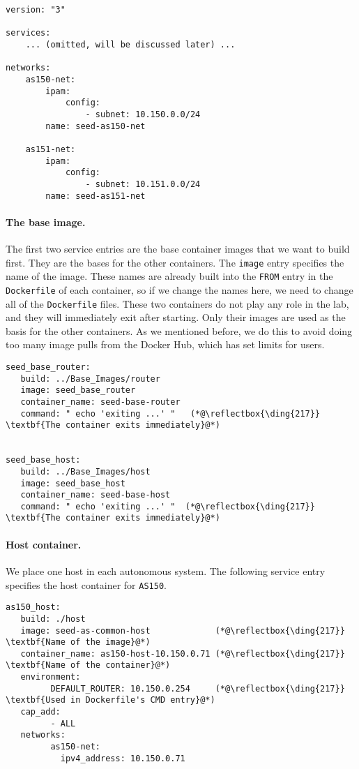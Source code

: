 \begin{lstlisting}
version: "3"

services:
    ... (omitted, will be discussed later) ...

networks:
    as150-net:
        ipam:
            config:
                - subnet: 10.150.0.0/24
        name: seed-as150-net

    as151-net:
        ipam:
            config:
                - subnet: 10.151.0.0/24
        name: seed-as151-net
\end{lstlisting}
 


\paragraph{The base image.} 
The first two service entries are the base container images  
that we want to build first. They are the bases for the other containers. 
The \texttt{image} entry specifies the name of the image.
These names are already built into the 
\texttt{FROM} entry in the \texttt{Dockerfile} 
of each container, so if we change the names here,
we need to change all of the \texttt{Dockerfile} files. These 
two containers do not play any role in the lab, and they will
immediately exit after starting. Only their images 
are used as the basis for the other containers. As we 
mentioned before, we do this to avoid doing too many image 
pulls from the Docker Hub, which has set limits for users. 

\begin{lstlisting}
seed_base_router:
   build: ../Base_Images/router
   image: seed_base_router
   container_name: seed-base-router
   command: " echo 'exiting ...' "   (*@\reflectbox{\ding{217}} \textbf{The container exits immediately}@*) 


seed_base_host:
   build: ../Base_Images/host
   image: seed_base_host
   container_name: seed-base-host
   command: " echo 'exiting ...' "  (*@\reflectbox{\ding{217}} \textbf{The container exits immediately}@*) 
\end{lstlisting}
 


\paragraph{Host container.} We place one host in 
each autonomous system. The following service entry specifies
the host container for \texttt{AS150}.

\begin{lstlisting}
as150_host:
   build: ./host
   image: seed-as-common-host             (*@\reflectbox{\ding{217}} \textbf{Name of the image}@*) 
   container_name: as150-host-10.150.0.71 (*@\reflectbox{\ding{217}} \textbf{Name of the container}@*) 
   environment:
         DEFAULT_ROUTER: 10.150.0.254     (*@\reflectbox{\ding{217}} \textbf{Used in Dockerfile's CMD entry}@*)
   cap_add:
         - ALL
   networks:
         as150-net:
           ipv4_address: 10.150.0.71
\end{lstlisting}

